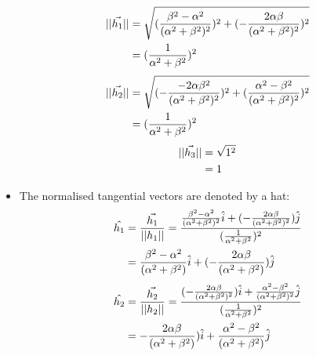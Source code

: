 \documentclass[12pt,a4paper]{article}
\begin{document}
\begin{itemize}
        \begin{equation}
    \begin{aligned}
       ||\vec{h_1}|| &= \sqrt{(\frac{\beta^2 - \alpha^2}{(\alpha^2+\beta^2)^2})^2 + (-\frac{2\alpha\beta}{(\alpha^2+\beta^2)^2})^2}\\
       &= (\frac{1}{\alpha^2+\beta^2})^2\notag
       \end{aligned}
    \end{equation}
    \begin{equation}
    \begin{aligned}
       ||\vec{h_2}|| &= \sqrt{(-\frac{-2\alpha\beta^2}{(\alpha^2+\beta^2)^2})^2 + (\frac{\alpha^2-\beta^2}{(\alpha^2+\beta^2)^2})^2}\\
       &= (\frac{1}{\alpha^2+\beta^2})^2\notag
       \end{aligned}
    \end{equation}
    \begin{equation}
    \begin{aligned}
       ||\vec{h_3}|| &= \sqrt{1^2}\\
       &=1\notag
       \end{aligned}
    \end{equation}
    \item The normalised tangential vectors are denoted by a hat:\\
    \begin{equation}
    \begin{aligned}
       \hat{h_1} &= \frac{\vec{h_1}}{||h_1||}
       = \frac{\frac{\beta^2 -\alpha^2}{(\alpha^2+\beta^2)^2}\hat{i}+(-\frac{2\alpha\beta}{(\alpha^2+\beta^2)^2})\hat{j}}{(\frac{1}{\alpha^2+\beta^2})^2}\\
       &= \frac{\beta^2 -\alpha^2}{(\alpha^2+\beta^2)}\hat{i}+(-\frac{2\alpha\beta}{(\alpha^2+\beta^2)})\hat{j}\notag
       \end{aligned}
    \end{equation}
    \begin{equation}
    \begin{aligned}
       \hat{h_2} &= \frac{\vec{h_2}}{||h_2||}
       = \frac{(-\frac{2\alpha\beta}{(\alpha^2+\beta^2)^2})\hat{i}+\frac{\alpha^2 - \beta^2}{(\alpha^2+\beta^2)^2}\hat{j}}{(\frac{1}{\alpha^2+\beta^2})^2}\\
       &= -\frac{2\alpha\beta}{(\alpha^2+\beta^2)})\hat{i}+\frac{\alpha^2 - \beta^2}{(\alpha^2+\beta^2)}\hat{j}\notag
       \end{aligned}
    \end{equation}

\end{itemize}
\end{document}
